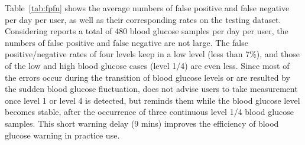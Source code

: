 
\textcolor[rgb]{1.00,0.00,0.00}{Table~\ref{tab:fpfn} shows the average numbers of false positive and false negative per day per user, as well as their corresponding rates on the testing dataset. Considering \sysname reports a total of 480 blood glucose samples per day per user, the numbers of false positive and false negative are not large.
The false positive/negative rates of four levels keep in a low level (less than 7\%), and those of the low and high blood glucose cases (level 1/4) are even less.  Since most of the errors occur during the transition of blood glucose levels or are resulted by the sudden blood glucose fluctuation, \sysname does not advise users to take measurement once level 1 or level 4 is detected, but reminds them while the blood glucose level becomes stable, \ie after the occurrence of three continuous level 1/4 blood glucose samples. This short warning delay (9 mins) improves the efficiency of blood glucose warning in practice use.}

